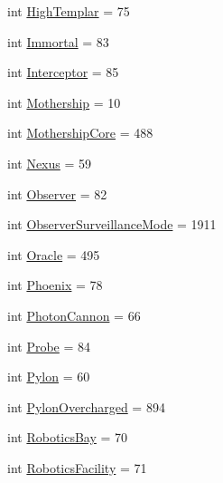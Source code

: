\begin{DoxyCompactItemize}
\item 
int \mbox{\hyperlink{classpysc2_1_1lib_1_1units_1_1_protoss_a7d4e5eebe7ba7b7c42fa0ac0b0049cf5}{High\+Templar}} = 75
\item 
int \mbox{\hyperlink{classpysc2_1_1lib_1_1units_1_1_protoss_a7059d5c34abc005d6217f824029bfb8f}{Immortal}} = 83
\item 
int \mbox{\hyperlink{classpysc2_1_1lib_1_1units_1_1_protoss_ac2caf1f516c0af03c47e6662b0001705}{Interceptor}} = 85
\item 
int \mbox{\hyperlink{classpysc2_1_1lib_1_1units_1_1_protoss_afc88a903915335b986b76a3d6d2279e5}{Mothership}} = 10
\item 
int \mbox{\hyperlink{classpysc2_1_1lib_1_1units_1_1_protoss_aca00c11bcec4e1991b68737126a64d54}{Mothership\+Core}} = 488
\item 
int \mbox{\hyperlink{classpysc2_1_1lib_1_1units_1_1_protoss_a3c78a516ec4b388a185f9e2b989c7fd9}{Nexus}} = 59
\item 
int \mbox{\hyperlink{classpysc2_1_1lib_1_1units_1_1_protoss_aaba4955b67d544ee249ff699f6a28e24}{Observer}} = 82
\item 
int \mbox{\hyperlink{classpysc2_1_1lib_1_1units_1_1_protoss_aecab12894f997185dd3975a2e4a455f6}{Observer\+Surveillance\+Mode}} = 1911
\item 
int \mbox{\hyperlink{classpysc2_1_1lib_1_1units_1_1_protoss_a468f02fce4c850ce84e0a795b2e1b1ac}{Oracle}} = 495
\item 
int \mbox{\hyperlink{classpysc2_1_1lib_1_1units_1_1_protoss_a25a9082764b5cfd1ca747fc711d69c16}{Phoenix}} = 78
\item 
int \mbox{\hyperlink{classpysc2_1_1lib_1_1units_1_1_protoss_a6d3d288f4fd3452aa536804e3b6cebe3}{Photon\+Cannon}} = 66
\item 
int \mbox{\hyperlink{classpysc2_1_1lib_1_1units_1_1_protoss_a1dc1a4af2e9e575550ebd541103681ed}{Probe}} = 84
\item 
int \mbox{\hyperlink{classpysc2_1_1lib_1_1units_1_1_protoss_a16e53617c97602979b12663daebf5ef3}{Pylon}} = 60
\item 
int \mbox{\hyperlink{classpysc2_1_1lib_1_1units_1_1_protoss_ae980f8e5fc3aea730d18798a21f98f80}{Pylon\+Overcharged}} = 894
\item 
int \mbox{\hyperlink{classpysc2_1_1lib_1_1units_1_1_protoss_a8715491c15b4509e9196d66e58507d9c}{Robotics\+Bay}} = 70
\item 
int \mbox{\hyperlink{classpysc2_1_1lib_1_1units_1_1_protoss_a35e8e516ccc59e69c36878ce9fb7edfe}{Robotics\+Facility}} = 71
\item 

\end{DoxyCompactItemize}

